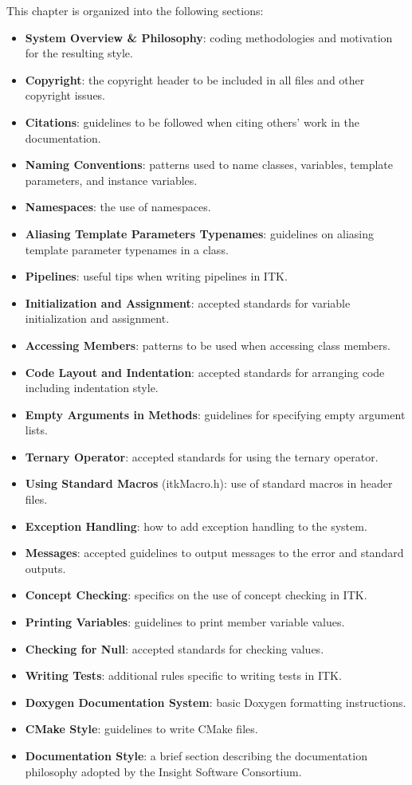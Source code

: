 This chapter is organized into the following sections:
\begin{itemize}
\item \textbf{System Overview \& Philosophy}: coding methodologies and
motivation for the resulting style.
\item \textbf{Copyright}: the copyright header to be included in all files and
other copyright issues.
\item \textbf{Citations}: guidelines to be followed when citing others' work in
the documentation.
\item \textbf{Naming Conventions}: patterns used to name classes, variables,
template parameters, and instance variables.
\item \textbf{Namespaces}: the use of namespaces.
\item \textbf{Aliasing Template Parameters Typenames}: guidelines on aliasing
template parameter typenames in a class.
\item \textbf{Pipelines}: useful tips when writing pipelines in ITK.
\item \textbf{Initialization and Assignment}: accepted standards for variable
initialization and assignment.
\item \textbf{Accessing Members}: patterns to be used when accessing class
members.
\item \textbf{Code Layout and Indentation}: accepted standards for arranging
code including indentation style.
\item \textbf{Empty Arguments in Methods}: guidelines for specifying empty
argument lists.
\item \textbf{Ternary Operator}: accepted standards for using the ternary
operator.
\item \textbf{Using Standard Macros} (itkMacro.h): use of standard macros in
header files.
\item \textbf{Exception Handling}: how to add exception handling to the system.
\item \textbf{Messages}: accepted guidelines to output messages to the error
and standard outputs.
\item \textbf{Concept Checking}: specifics on the use of concept checking in
ITK.
\item \textbf{Printing Variables}: guidelines to print member variable values.
\item \textbf{Checking for Null}: accepted standards for checking 
values.
\item \textbf{Writing Tests}: additional rules specific to writing tests in ITK.
\item \textbf{Doxygen Documentation System}: basic Doxygen formatting
instructions.
\item \textbf{CMake Style}: guidelines to write CMake files.
\item \textbf{Documentation Style}: a brief section describing the
documentation philosophy adopted by the Insight Software Consortium.
\end{itemize}

